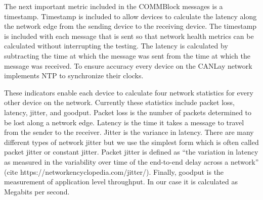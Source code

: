 \documentclass[letterpaper,twocolumn,10pt]{article}
\begin{document}

The next important metric included in the COMMBlock messages is a timestamp. Timestamp is included to allow devices to calculate the latency along the network edge from the sending device to the receiving device.
The timestamp is included with each message that is sent so that network health metrics can be calculated without interrupting the testing. The latency is calculated by subtracting the time at which the message was sent from the time at which the message was received. To ensure accuracy every device on the CANLay network implements NTP to synchronize their clocks.

These indicators enable each device to calculate four network statistics for every other device on the network. Currently these statistics include packet loss, latency, jitter, and goodput. Packet loss is the number of packets determined to be lost along a network edge. Latency is the time it takes a message to travel from the sender to the receiver. Jitter is the variance in latency. There are many different types of network jitter but we use the simplest form which is often called packet jitter or constant jitter. Packet jitter is defined as “the variation in latency as measured in the variability over time of the end-to-end delay across a network”
(cite https://networkencyclopedia.com/jitter/). Finally, goodput is the measurement of application level throughput. In our case it is calculated as Megabits per second.
\end{document}
